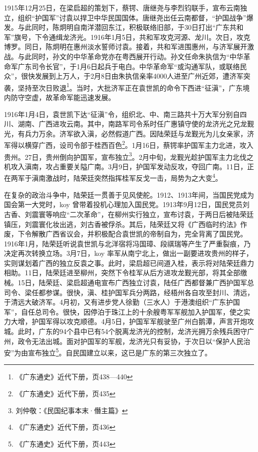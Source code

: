 1915年12月25日，在梁启超的策划下，蔡锷、唐继尧与李烈钧联手，宣布云南独立，组织“护国军”讨袁以捍卫中华民国国体。唐继尧出任云南都督，“护国战争”爆发。与此同时，陈炯明自南洋潜回东江，积极联络旧部，于30日打出“广东共和军”旗号，下令通缉龙济光。1916年1月5日，共和军攻克河源、龙川。次日，攻克博罗。同日，陈炯明在惠州淡水誓师讨袁。接着，共和军进围惠州，与济军展开激战。与此同时，孙文的中华革命党亦在粤西展开行动。孙文任命朱执信为“中华革命军广东司令长官”，于1月6日起兵于电白。中华革命军“或沟通军队，或联络民众”，很快发展到上万人，于2月8日由朱执信亲率4000人进至广州近郊，遭济军突袭，坚持至次日败退\footnote{《广东通史》近代下册，页438—440}。当时，大批济军正在袁世凯的命令下西进“征滇”，广东境内防守空虚，故革命军能迅速发展。

1916年1月4日，袁世凯下达“征滇”令，组织北、中、南三路共十万大军分别自四川、湖南、广西进攻云南。其中，南路军司令系时任广惠镇守使的龙济光之兄龙觐光，有兵力万余。济军欲入滇，必然假道广西。因陆荣廷与龙觐光为儿女亲家，济军得以横穿广西，设司令部于桂西百色\footnote{《广东通史》近代下册，页435}。1月16日，蔡锷率护国军主力北进，攻入贵州。27日，贵州倒向护国军，宣布独立\footnote{刘仲敬：《民国纪事本末·僭主篇》}。2月中旬，龙觐光趁护国军主力北伐之机攻入滇南，攻占重要关隘广南。3月9日，护国军发动反攻，夺回广南。11日，正在两军于滇南激战时，陆荣廷突然指挥桂军反戈一击，局势为之大变\footnote{《广东通史》近代下册，页436}。

在复杂的政治斗争中，陆荣廷一贯善于见风使舵。1912、1913年间，当国民党成为国会第一大党时，koy 曾带着投机心理加入国民党。1913年9月12日，国民党员刘古香、刘震寰等响应“二次革命”，在柳州实行独立，宣布讨袁，于两日后被陆荣廷镇压，刘震寰化妆出逃，刘古香被俘杀。其后，陆荣廷又将《广西临时约法》作废，下令解散广西省议会，并积极配合袁世凯的帝制自为，完全背离了国民党。1916年1月，陆荣廷听说袁世凯与北洋宿将冯国璋、段祺瑞等产生了严重裂痕，乃决定再次转换立场。3月7日，koy 率军从南宁北上，做出一副要进攻贵州的样子，实则谋划着广西的独立反袁之事。此时，梁启超已间道入桂，表示将对陆荣廷鼎力相助。11日，陆荣廷进至柳州，突然下令桂军从后方进攻龙觐光部，将其全部缴械。15日，陆荣廷、梁启超通电宣布广西独立讨袁，陆任广西都督兼广西护国军总司令、梁任都参谋。很快，滇、桂护国军兵分两路，经梧州各自攻至封川、清远，于清远大破济军。4月初，又有进步党人徐勤（三水人）于港澳组织“广东护国军”，自任总司令。很快，因停泊于珠江上的十余艘粤军军舰加入护国军，使之实力大增，护国军得以攻克顺德。4月5日，护国军军舰驶至广州白鹅潭，声言开炮攻城。此时，广东的94个县中已有54个脱离龙济光的控制，龙济光拥万余残兵困守广州，政令无法出城。面对护国军的军舰，龙济光只有妥协，于次日以“保护人民治安”为由宣布独立\footnote{《广东通史》近代下册，页443}。自民国建立以来，这已是广东的第三次独立了。

